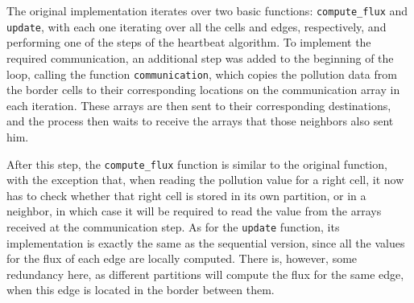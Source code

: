 The original implementation iterates over two basic functions: \texttt{compute\_flux} and \texttt{update}, with each one iterating over all the cells and edges, respectively, and performing one of the steps of the heartbeat algorithm. To implement the required communication, an additional step was added to the beginning of the loop, calling the function \texttt{communication}, which copies the pollution data from the border cells to their corresponding locations on the communication array in each iteration. These arrays are then sent to their corresponding destinations, and the process then waits to receive the arrays that those neighbors also sent him.

After this step, the \texttt{compute\_flux} function is similar to the original function, with the exception that, when reading the pollution value for a right cell, it now has to check whether that right cell is stored in its own partition, or in a neighbor, in which case it will be required to read the value from the arrays received at the communication step. As for the \texttt{update} function, its implementation is exactly the same as the sequential version, since all the values for the flux of each edge are locally computed. There is, however, some redundancy here, as different partitions will compute the flux for the same edge, when this edge is located in the border between them.

